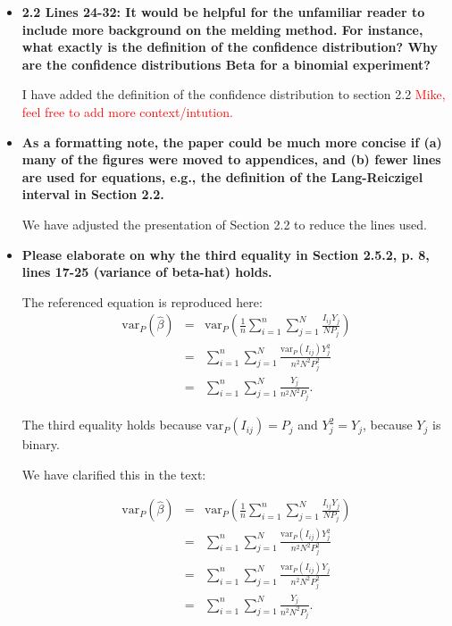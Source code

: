 \documentclass[11pt]{article}
\begin{document}
\begin{itemize}
\begin{itemize}
        \item \textbf{2.2 Lines 24-32: It would be helpful for the unfamiliar reader to include more background on the melding method. For instance, what exactly is the definition of the confidence distribution? Why are the confidence distributions Beta for a binomial experiment?}
        
        I have added the definition of the confidence distribution to section 2.2
        \textcolor{red}{Mike, feel free to add more context/intution.}

        \item \textbf{As a formatting note, the paper could be much more concise if (a) many of the figures were moved to appendices, and (b) fewer lines are used for equations, e.g., the definition of the Lang-Reiczigel interval in Section 2.2.}
        
        We have adjusted the presentation of Section 2.2 to reduce the lines used.

        \item \textbf{Please elaborate on why the third equality in Section 2.5.2, p. 8, lines 17-25 (variance of  beta-hat) holds.}

        The referenced equation is reproduced here:
        \begin{eqnarray*}
        \textrm{var}_P \left(\hat{\beta} \right) & = & \textrm{var}_P \left(  \frac{1}{n}  \sum_{i=1}^{n} \sum_{j=1}^{N}  \frac{ I_{ij}  Y_j}{N P_j} \right)  \\
        & = &    \sum_{i=1}^{n} \sum_{j=1}^{N}  \frac{ \textrm{var}_P( I_{ij})  Y_j^2}{n^2 N^2 P_j^2}  \\
        & = &    \sum_{i=1}^{n} \sum_{j=1}^{N}  \frac{   Y_j}{n^2 N^2 P_j}.
        \end{eqnarray*}
        
        The third equality holds because \( \textrm{var}_P( I_{ij}) = P_j \) and \( Y_j^2= Y_j \), because \( Y_j \) is binary.
        
        We have clarified this in the text:
        
        \begin{eqnarray*}
        \textrm{var}_P \left(\hat{\beta} \right) & = & \textrm{var}_P \left(  \frac{1}{n}  \sum_{i=1}^{n} \sum_{j=1}^{N}  \frac{ I_{ij}  Y_j}{N P_j} \right)  \\
        & = &    \sum_{i=1}^{n} \sum_{j=1}^{N}  \frac{ \textrm{var}_P( I_{ij})  Y_j^2}{n^2 N^2 P_j^2}  \\
        & = &    \sum_{i=1}^{n} \sum_{j=1}^{N}  \frac{ \textrm{var}_P( I_{ij})  Y_j}{n^2 N^2 P_j^2}  \\
        & = &    \sum_{i=1}^{n} \sum_{j=1}^{N}  \frac{   Y_j}{n^2 N^2 P_j}.
        \end{eqnarray*}
        


\end{itemize}
\end{itemize}
\end{document}
